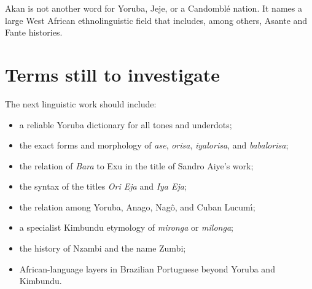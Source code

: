 Akan is not another word for Yoruba, Jeje,
or a Candombl\'e nation.  It names a large
West African ethnolinguistic field that
includes, among others, Asante and Fante
histories.

\section{Terms still to investigate}
\label{section-languages-open-terms}

The next linguistic work should include:

\begin{itemize}
\item a reliable Yoruba dictionary for all
tones and underdots;
\item the exact forms and morphology of
\emph{ase}, \emph{orisa},
\emph{iyalorisa}, and
\emph{babalorisa};
\item the relation of \emph{Bara} to
Exu in the title of Sandro Aiye's work;
\item the syntax of the titles
\emph{Ori Eja} and \emph{Iya Eja};
\item the relation among Yoruba, Anago,
Nag\^o, and Cuban Lucum\'\i;
\item a specialist Kimbundu etymology of
\emph{mironga} or \emph{milonga};
\item the history of Nzambi and the name
Zumbi;
\item African-language layers in Brazilian
Portuguese beyond Yoruba and Kimbundu.
\end{itemize}





